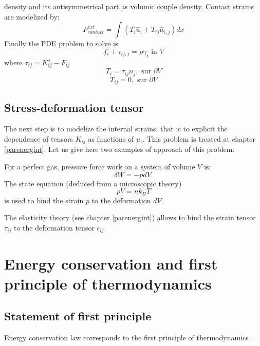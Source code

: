 \documentclass[12pt]{book}
\begin{document}
density and its antisymmetrical part as volumic couple density. Contact
strains are modelized by: 
\begin{equation}
P^{ext}_{contact}=\int (T_i\hat{u}_i+T_{ij}\hat{u}_{i,j})dx
\end{equation}
Finally the PDE problem to solve is:
\begin{equation}
f_i+\tau_{ij,j}=\rho \gamma_i \mbox{ in } V
\end{equation}
where $\tau_{ij}=K_{ij}^s-F_{ij}$
\begin{equation}
T_i=\tau_{ij}n_j, \mbox{ sur } \partial V
\end{equation}
\begin{equation}
T_{ij}=0, \mbox{ sur } \partial V
\end{equation}
\subsection{Stress-deformation tensor}
The next step is to modelize the internal strains. that is to explicit the
dependence of tensors $K_{ij}$ as functions of $u_i$.
This problem is treated at chapter \ref{parenergint}.
Let us give here two examples of approach of this problem.
\begin{exmp}
For a perfect gas, pressure force work on a system of volume $V$ is:
\begin{equation}
\delta W=-pdV.
\end{equation}
The state equation (deduced from a microscopic theory)
\begin{equation}
pV=nk_BT
\end{equation}
is used to bind the strain $p$ to the deformation $dV$.
\end{exmp}
\begin{exmp}
The elasticity theory (see chapter \ref{parenergint}) allows to bind the
strain tensor $\tau_{ij}$ to the deformation tensor $\epsilon_{ij}$ 
\end{exmp}
\section[Energy conservation]{Energy conservation and first principle of thermodynamics}\label{secpremierprinci}
\subsection{Statement of first principle}
Energy conservation law corresponds to the first principle of thermodynamics
\cite{ph:fluid:Truesdell66,ph:fluid:Germain80,ph:elect:Petit89}.
\end{document}

